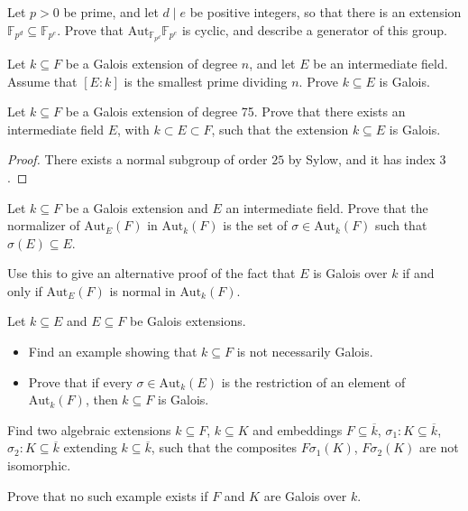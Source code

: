 \documentclass[openany]{book}
\begin{document}
\begin{prop}
Let $p > 0$ be prime, and let $d \mid e$ be positive integers, so that there is an extension $\mathbb{F}_{p^d} \subseteq \mathbb{F}_{p^e}$. Prove that $\text{Aut}_{\mathbb{F}_{p^d}} \mathbb{F}_{p^e}$ is cyclic, and describe a generator of this group.
\end{prop}

\begin{prop}
Let $k \subseteq F$ be a Galois extension of degree $n$, and let $E$ be an intermediate field. Assume that $[E : k]$ is the smallest prime dividing $n$. Prove $k \subseteq E$ is Galois.
\end{prop}

\begin{prob}
Let $k \subseteq F$ be a Galois extension of degree 75. Prove that there exists an intermediate field $E$, with $k \subset E \subset F$, such that the extension $k \subseteq E$ is Galois.
\end{prob}
\begin{proof}
    There exists a normal subgroup of order $25$ by Sylow, and it has index $3$.
\end{proof}

\begin{prob}
Let $k \subseteq F$ be a Galois extension and $E$ an intermediate field. Prove that the normalizer of $\text{Aut}_E(F)$ in $\text{Aut}_k(F)$ is the set of $\sigma \in \text{Aut}_k(F)$ such that $\sigma(E) \subseteq E$.

Use this to give an alternative proof of the fact that $E$ is Galois over $k$ if and only if $\text{Aut}_E(F)$ is normal in $\text{Aut}_k(F)$.
\end{prob}

\begin{prob}
Let $k \subseteq E$ and $E \subseteq F$ be Galois extensions.
\begin{itemize}
    \item Find an example showing that $k \subseteq F$ is not necessarily Galois.
    \item Prove that if every $\sigma \in \text{Aut}_k(E)$ is the restriction of an element of $\text{Aut}_k(F)$, then $k \subseteq F$ is Galois.
\end{itemize}
\end{prob}

\begin{prob}
Find two algebraic extensions $k \subseteq F$, $k \subseteq K$ and embeddings $F \subseteq \overline{k}$, $\sigma_1 : K \subseteq \overline{k}$, $\sigma_2 : K \subseteq \overline{k}$ extending $k \subseteq \overline{k}$, such that the composites $F\sigma_1(K)$, $F\sigma_2(K)$ are not isomorphic.

Prove that no such example exists if $F$ and $K$ are Galois over $k$.
\end{prob}
\end{document}
